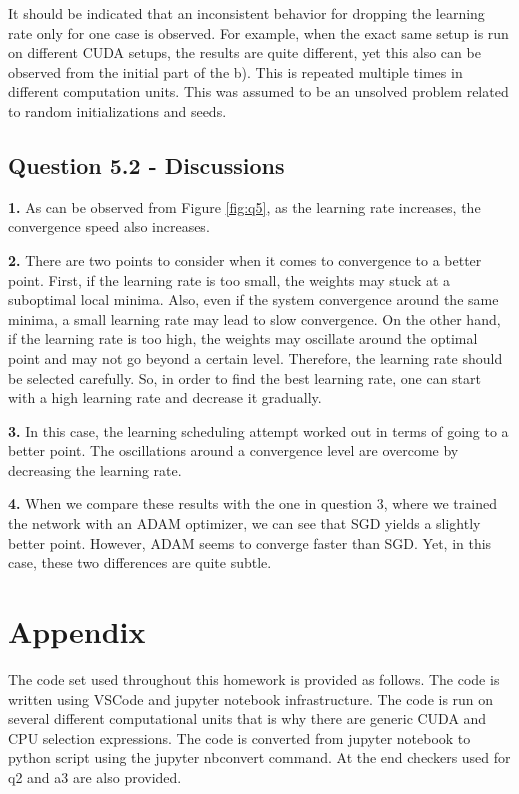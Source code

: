 \documentclass{assignment}
\begin{document}
\noindent It should be indicated that an inconsistent behavior for dropping the learning rate only for one case is observed. For example, when the exact same setup is run on different CUDA setups, the results are quite different, yet this also can be observed from the initial part of the b). This is repeated multiple times in different computation units. This was assumed to be an unsolved problem related to random initializations and seeds.

\subsection*{Question 5.2 - Discussions}

\textbf{1.}
\noindent As can be observed from Figure \ref{fig:q5}, as the learning rate increases, the convergence speed also increases.

\textbf{2.}
\noindent There are two points to consider when it comes to convergence to a better point. First, if the learning rate is too small, the weights may stuck at a suboptimal local minima. Also, even if the system convergence around the same minima, a small learning rate may lead to slow convergence. On the other hand, if the learning rate is too high, the weights may oscillate around the optimal point and may not go beyond a certain level. Therefore, the learning rate should be selected carefully. So, in order to find the best learning rate, one can start with a high learning rate and decrease it gradually. 

\textbf{3.}
\noindent In this case, the learning scheduling attempt worked out in terms of going to a better point. The oscillations around a convergence level are overcome by decreasing the learning rate. 

\textbf{4.}
\noindent When we compare these results with the one in question 3, where we trained the network with an ADAM optimizer, we can see that SGD yields a slightly better point. However, ADAM seems to converge faster than SGD. Yet, in this case, these two differences are quite subtle.


\section*{Appendix}
The code set used throughout this homework is provided as follows. The code is written using VSCode and jupyter notebook infrastructure. The code is run on several different computational units that is why there are generic CUDA and CPU selection expressions. The code is converted from jupyter notebook to python script using the jupyter nbconvert command. At the end checkers used for q2 and a3 are also provided.








\nocite{*} 
\end{document}
